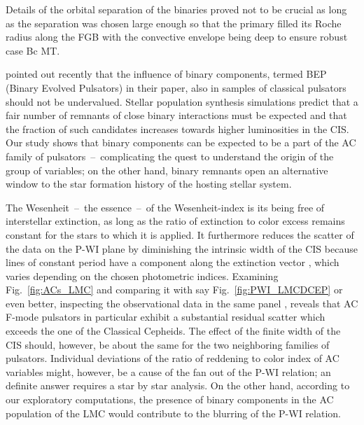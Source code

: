 \documentclass[a4paper,fleqn,usenatbib]{mnras}
\begin{document}
Details of the orbital separation of the binaries proved not to be crucial as 
long as the separation was chosen large enough so that the primary filled its Roche radius 
along the FGB with the convective envelope being deep to ensure robust case Bc MT. 


\citet{Karczmarek2016} pointed out recently that the influence of binary components, 
termed BEP (Binary Evolved Pulsators) in their paper, also in samples of classical pulsators 
should  not be undervalued. Stellar population synthesis simulations predict that a fair number of 
remnants of close binary interactions must be expected and that the fraction of such 
candidates increases towards higher luminosities in the CIS. Our study shows that binary 
components can be expected to be a part of the AC family of 
pulsators~--~complicating the quest to understand the origin of the 
group of variables; on the other hand, binary remnants open an alternative window to the star 
formation history of the hosting stellar system.

The Wesenheit~--~the essence~--~of the Wesenheit-index is its being
free of interstellar extinction, as long as the  ratio of extinction to color excess 
remains constant for the stars to which it is applied. It furthermore reduces 
the scatter of the data on the P-WI plane by diminishing the intrinsic 
width of the CIS because lines of constant period have a 
component along the extinction vector \citep[cf.][]{Madore1991}, which varies depending on the chosen photometric indices. Examining Fig.~\ref{fig:ACs_LMC} 
and comparing it with say Fig.~\ref{fig:PWI_LMCDCEP} or even better, inspecting
the observational data in the same panel \citep[Fig.~5 of][]{Soszynski2015},
reveals that AC F-mode pulsators in particular exhibit a substantial 
residual scatter which exceeds the one of the Classical Cepheids.
The effect of the finite width of the CIS should, however, be about the 
same for the two neighboring families of pulsators. Individual deviations 
of the ratio of reddening to color index of AC variables might, however, be a cause 
of the fan out of the P-WI relation; an definite answer requires
a star by star analysis. On the other hand, according to our exploratory computations, 
the presence of binary components in the AC population of the LMC would contribute 
to the blurring of the P-WI relation.    
\end{document}
